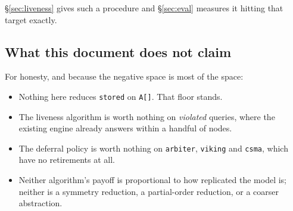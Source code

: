 \S\ref{sec:liveness} gives such a procedure and \S\ref{sec:eval} measures it hitting that target
exactly.

\subsection{What this document does not claim}

For honesty, and because the negative space is most of the space:

\begin{itemize}
  \item Nothing here reduces \texttt{stored} on \texttt{A[]}. That floor stands.
  \item The liveness algorithm is worth nothing on \emph{violated} queries, where the existing
        engine already answers within a handful of nodes.
  \item The deferral policy is worth nothing on \texttt{arbiter}, \texttt{viking} and \texttt{csma},
        which have no retirements at all.
  \item Neither algorithm's payoff is proportional to how replicated the model is; neither is a
        symmetry reduction, a partial-order reduction, or a coarser abstraction.
\end{itemize}
